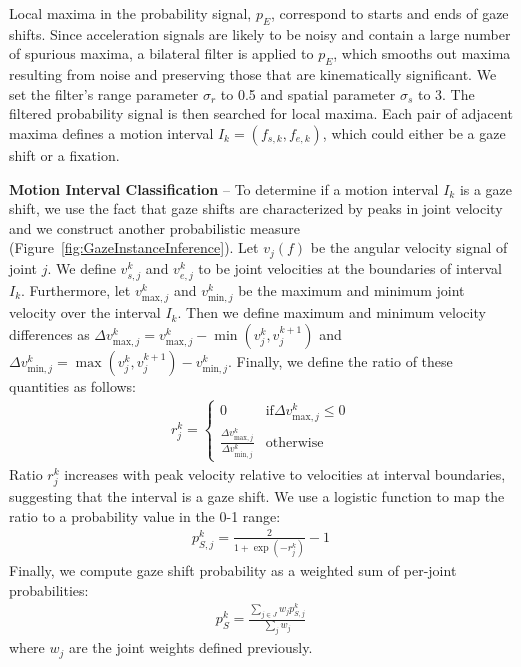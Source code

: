 Local maxima in the probability signal, $p_E$, correspond to starts and ends of gaze shifts. Since acceleration signals are likely to be noisy and contain a large number of spurious maxima, a bilateral filter is applied to $p_E$, which smooths out maxima resulting from noise and preserving those that are kinematically significant. We set the filter's range parameter $\sigma_r$ to 0.5 and spatial parameter $\sigma_s$ to 3. The filtered probability signal is then searched for local maxima. Each pair of adjacent maxima defines a motion interval $I_k = (f_{s,k}, f_{e,k})$, which could either be a gaze shift or a fixation.

\noindent\textbf{Motion Interval Classification} -- To determine if a motion interval $I_k$ is a gaze shift, we use the fact that gaze shifts are characterized by peaks in joint velocity and we construct another probabilistic measure (Figure~\ref{fig:GazeInstanceInference}). Let $v_j(f)$ be the angular velocity signal of joint $j$. We define $v_{s,j}^k$ and $v_{e,j}^k$ to be joint velocities at the boundaries of interval $I_k$. Furthermore, let $v_{\mathrm{max},j}^k$ and $v_{\mathrm{min},j}^k$ be the maximum and minimum joint velocity over the interval $I_k$. Then we define maximum and minimum velocity differences as $\Delta v_{\mathrm{max},j}^k = v_{\mathrm{max},j}^k - \mathop{min} (v_j^k, v_j^{k+1})$ and $\Delta v_{\mathrm{min},j}^k = \mathop{max} (v_j^k, v_j^{k+1}) - v_{\mathrm{min},j}^k$. Finally, we define the ratio of these quantities as follows:
%
\begin{align} \label{eq:GazeShiftRatio}
r_j^k =
\begin{cases}
0 & \text{if} \Delta v_{\mathrm{max},j}^k \leq 0 \\
\frac{\Delta v_{\mathrm{max},j}^k}{\Delta v_{\mathrm{min},j}^k} & \text{otherwise}
\end{cases}
\end{align}
%
Ratio $r_j^k$ increases with peak velocity relative to velocities at interval boundaries, suggesting that the interval is a gaze shift. We use a logistic function to map the ratio to a probability value in the 0-1 range:
%
\begin{align} \label{eq:GazeShiftProbability}
p_{S,j}^k = \frac{2}{1 + \mathop{exp}(-r_j^k)} - 1
\end{align}
%
Finally, we compute gaze shift probability as a weighted sum of per-joint probabilities:
%
\begin{align} \label{eq:GazeShiftGlobalProbability}
p_S^k = \frac{\sum_{j \in J} w_j p_{S,j}^k}{\sum_j w_j}
\end{align}
%
where $w_j$ are the joint weights defined previously.

